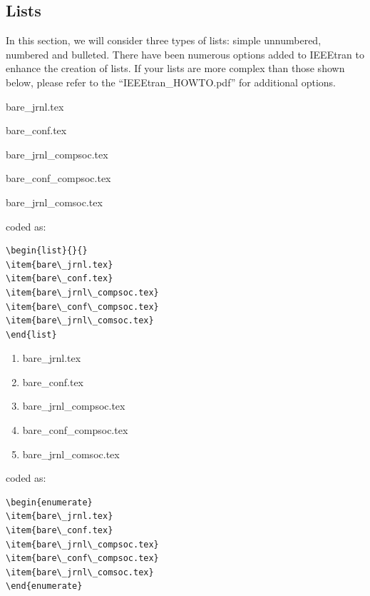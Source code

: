\documentclass[lettersize,journal]{IEEEtran}
\begin{document}
\subsection{Lists}
\noindent In this section, we will consider three types of lists: simple unnumbered, numbered and bulleted. There have been numerous options added to IEEEtran to enhance the creation of lists. If your lists are more complex than those shown below, please refer to the  ``IEEEtran\_HOWTO.pdf'' for additional options.\\


\begin{list}{}{}
\item{bare\_jrnl.tex}
\item{bare\_conf.tex}
\item{bare\_jrnl\_compsoc.tex}
\item{bare\_conf\_compsoc.tex}
\item{bare\_jrnl\_comsoc.tex}
\end{list}

\noindent coded as:
\begin{verbatim}
\begin{list}{}{}
\item{bare\_jrnl.tex}
\item{bare\_conf.tex}
\item{bare\_jrnl\_compsoc.tex}
\item{bare\_conf\_compsoc.tex}
\item{bare\_jrnl\_comsoc.tex}
\end{list}
\end{verbatim}

\begin{enumerate}
\item{bare\_jrnl.tex}
\item{bare\_conf.tex}
\item{bare\_jrnl\_compsoc.tex}
\item{bare\_conf\_compsoc.tex}
\item{bare\_jrnl\_comsoc.tex}
\end{enumerate}
\noindent coded as:
\begin{verbatim}
\begin{enumerate}
\item{bare\_jrnl.tex}
\item{bare\_conf.tex}
\item{bare\_jrnl\_compsoc.tex}
\item{bare\_conf\_compsoc.tex}
\item{bare\_jrnl\_comsoc.tex}
\end{enumerate}
\end{verbatim}
\end{document}
